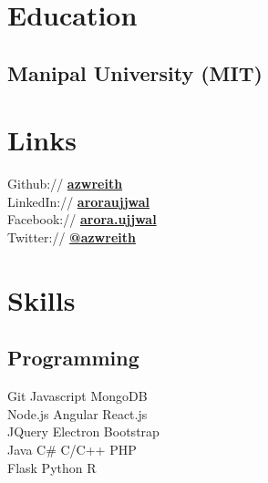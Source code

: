 \documentclass[a4paper]{resume}
\begin{document}
\begin{minipage}[t]{0.33\textwidth} %


\section{Education}

\subsection{Manipal University (MIT)}




\section{Links}

Github:// \href{https://github.com/azwreith}{\bf azwreith} \\
LinkedIn:// \href{https://in.linkedin.com/in/aroraujjwal}{\bf aroraujjwal} \\
Facebook:// \href{https://www.facebook.com/arora.ujjwal}{\bf arora.ujjwal} \\
Twitter:// \href{https://twitter.com/DarthUjj}{\bf @azwreith} \\

\sectionspace %



\section{Skills}

\subsection{Programming}

Git \textbullet{} Javascript \textbullet{} MongoDB \\
Node.js \textbullet{} Angular \textbullet{} React.js \\
JQuery \textbullet{} Electron \textbullet{} Bootstrap \\
Java \textbullet{} C\# \textbullet{} C/C++ \textbullet{} PHP \\
Flask \textbullet{} Python \textbullet{} R \\


\end{minipage}
\end{document}
